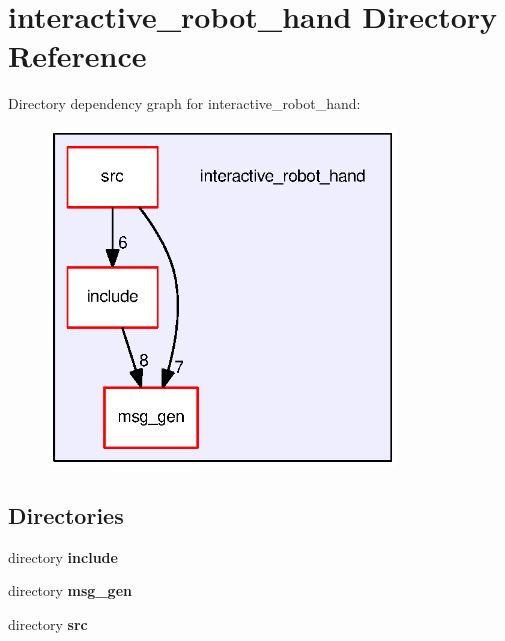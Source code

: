 \section{interactive\-\_\-robot\-\_\-hand Directory Reference}
\label{dir_081735ff1c96ed9b0f5dce2d690ee858}
Directory dependency graph for interactive\-\_\-robot\-\_\-hand\-:
\nopagebreak
\begin{figure}[H]
\begin{center}
\leavevmode
\includegraphics[width=262pt]{dir_081735ff1c96ed9b0f5dce2d690ee858_dep}
\end{center}
\end{figure}
\subsection*{Directories}
\begin{DoxyCompactItemize}
\item 
directory {\bf include}
\item 
directory {\bf msg\-\_\-gen}
\item 
directory {\bf src}
\end{DoxyCompactItemize}
